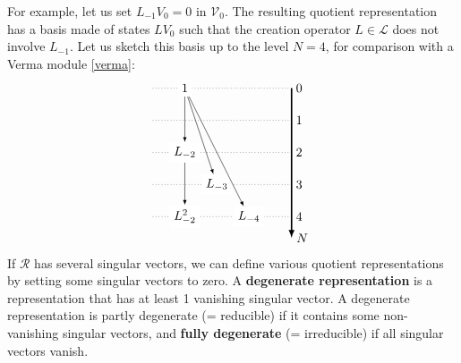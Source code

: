 \documentclass[12pt, a4paper]{article}
\newcommand{\myindex}[1]{\textbf{\boldmath #1}}
\begin{document}
For example, let us set $L_{-1}V_0=0$ in $\mathcal{V}_0$. The resulting quotient representation has a basis made of states $LV_0$ such that the creation operator $L\in\mathcal{L}$ does not involve $L_{-1}$. Let us sketch this basis up to the level $N=4$, for comparison with a Verma module \eqref{verma}:
 \begin{align}
 \begin{tikzpicture}[scale = .15, baseline=(current  bounding  box.center)]
  \draw[-latex, very thick] (20, 0) -- (20, -28) node [right] {$N$};
  \foreach \x in {0, ..., 4}
  {
  \draw [dotted] (-6, {-6*\x}) -- (20, {-6*\x}) node [right] {${\x}$};
  }
  \node[fill = white] at (0, 0) (0) {$1$};
  \node[fill = white] at (0,-12) (2) {$L_{-2}$};
  \node[fill = white] at (0,-24) (22) {$L_{-2}^2$};
  \node[fill = white] at (6,-18) (3) {$L_{-3}$};
  \node[fill = white] at (12,-24) (4) {$L_{-4}$};
  \draw[-latex] (0) -- (2);
  \draw[-latex] (0) -- (3);
  \draw[-latex] (0) -- (4);
  \draw[-latex] (2) -- (22);
 \end{tikzpicture}
 \label{r11}
\end{align}
If $\mathcal{R}$ has several singular vectors, we can define various quotient representations by setting some singular vectors to zero. A \myindex{degenerate representation} is a representation that has at least 1 vanishing singular vector. A degenerate representation is partly degenerate (= reducible) if it contains some non-vanishing singular vectors, and \myindex{fully degenerate} (= irreducible) if all singular vectors vanish.
\end{document}
